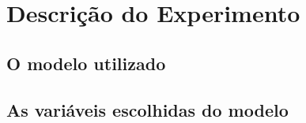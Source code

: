 \chapter{Descrição do Experimento}
\label{chap:descricao_do_experimento}


\section{O modelo utilizado}
\label{sec:o_modelo_utilizado}


\section{As variáveis escolhidas do modelo}
\label{sec:as_variavies_escolhidas_do_modelo}

